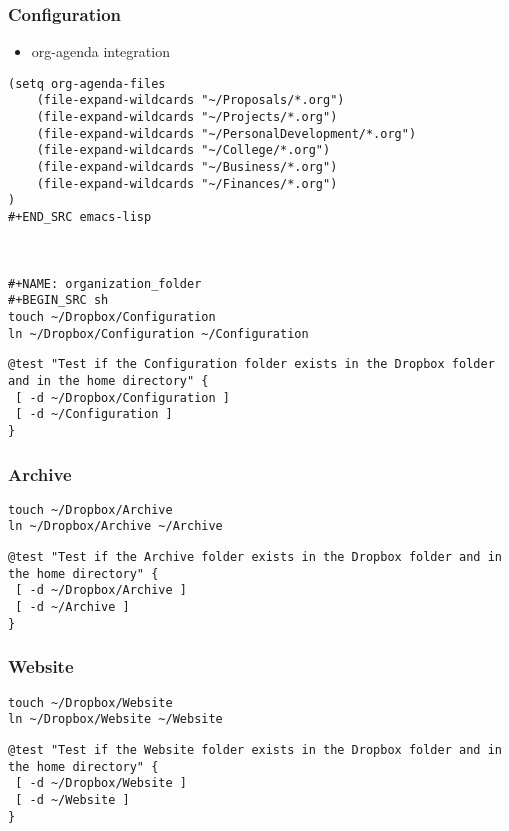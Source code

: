 \documentclass[11pt]{article}
\begin{document}
\subsubsection{Configuration}
\label{sec:orgf989de3}


\begin{itemize}
\item org-agenda integration
\end{itemize}
\begin{verbatim}
(setq org-agenda-files
    (file-expand-wildcards "~/Proposals/*.org")
    (file-expand-wildcards "~/Projects/*.org")
    (file-expand-wildcards "~/PersonalDevelopment/*.org")
    (file-expand-wildcards "~/College/*.org")
    (file-expand-wildcards "~/Business/*.org")
    (file-expand-wildcards "~/Finances/*.org")
)
#+END_SRC emacs-lisp



#+NAME: organization_folder
#+BEGIN_SRC sh
touch ~/Dropbox/Configuration
ln ~/Dropbox/Configuration ~/Configuration
\end{verbatim}

\begin{verbatim}
@test "Test if the Configuration folder exists in the Dropbox folder and in the home directory" {
 [ -d ~/Dropbox/Configuration ]
 [ -d ~/Configuration ]
}
\end{verbatim}

\subsubsection{Archive}
\label{sec:org6ab7665}
\begin{verbatim}
touch ~/Dropbox/Archive
ln ~/Dropbox/Archive ~/Archive
\end{verbatim}

\begin{verbatim}
@test "Test if the Archive folder exists in the Dropbox folder and in the home directory" {
 [ -d ~/Dropbox/Archive ]
 [ -d ~/Archive ]
}
\end{verbatim}

\subsubsection{Website}
\label{sec:org5ebd413}
\begin{verbatim}
touch ~/Dropbox/Website
ln ~/Dropbox/Website ~/Website
\end{verbatim}

\begin{verbatim}
@test "Test if the Website folder exists in the Dropbox folder and in the home directory" {
 [ -d ~/Dropbox/Website ]
 [ -d ~/Website ]
}
\end{verbatim}
\end{document}
